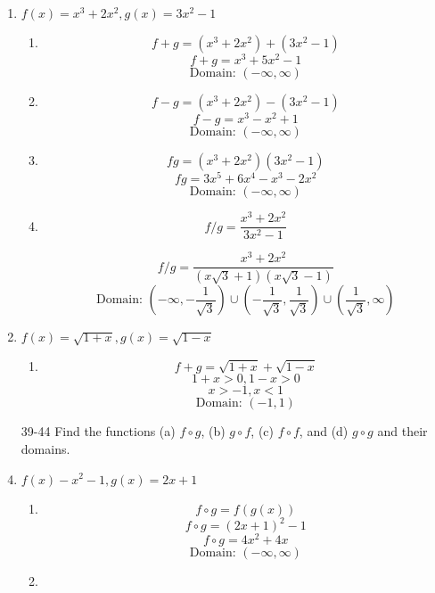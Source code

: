 \documentclass{article}
\begin{document}
\begin{enumerate}
		\item $f(x) = x^3 + 2x^2, g(x) = 3x^2 - 1$


		\begin{enumerate}
			\item 	$$f + g = (x^3 + 2x^2) + (3x^2 - 1)$$
			$$f + g = x^3 + 5x^2 - 1$$
			$$\text{Domain: } (-\infty, \infty)$$

			\item 

			$$f - g = (x^3 + 2x^2) - (3x^2 - 1)$$
			$$f - g = x^3 - x^2 + 1$$
			$$\text{Domain: } (-\infty, \infty)$$
			
			\item
			
			$$fg = (x^3 + 2x^2)(3x^2 - 1)$$
			$$fg = 3x^5 + 6x^4 - x^3 - 2x^2$$
			$$\text{Domain: } (-\infty, \infty)$$
			
			\item
			
			$$f / g = \frac{x^3 + 2x^2}{3x^2 - 1}$$
			
			$$f / g = \frac{x^3 + 2x^2}{(x\sqrt{3} + 1)(x\sqrt{3} - 1)}$$
			$$\text{Domain: } (-\infty, -\frac{1}{\sqrt{3}}) \cup (-\frac{1}{\sqrt{3}}, \frac{1}{\sqrt{3}}) \cup (\frac{1}{\sqrt{3}}, \infty)$$
		
		\end{enumerate}
			
		\item $f(x) = \sqrt{1 + x}, g(x) = \sqrt{1 - x}$
		
		\begin{enumerate}
			\item
			
			$$f + g = \sqrt{1 + x} + \sqrt{1 - x}$$
			$$1 + x > 0, 1 - x > 0$$
			$$x > -1, x < 1$$
			$$\text{Domain: } (-1, 1)$$
		\end{enumerate}
		
		\item[39-44] Find the functions (a) $f \circ g$, (b) $g \circ f$, (c) $f \circ f$, and (d) $g \circ g$ and their domains.
		
		\item $f(x) - x^2 - 1, g(x) = 2x + 1$
	
		\begin{enumerate}
			\item	
			$$f \circ g = f(g(x))$$
			$$f \circ g = (2x + 1)^2 - 1$$
			$$f \circ g = 4x^2 + 4x$$
			$$\text{Domain: } (-\infty, \infty)$$
			
			\item
			

\end{enumerate}
\end{enumerate}
\end{document}
